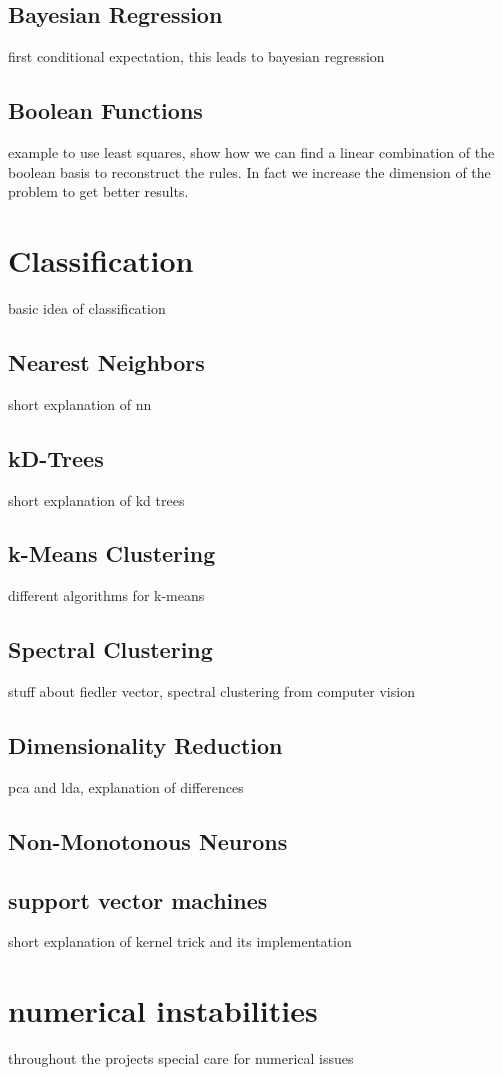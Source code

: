 \documentclass{article}
\begin{document}
\subsection{Bayesian Regression}
first conditional expectation, this leads to bayesian regression
\subsection{Boolean Functions}
example to use least squares, show how we can find a linear combination of the boolean basis to reconstruct the rules. In fact we increase the dimension of the problem to get better results.
\section{Classification}
basic idea of classification
\subsection{Nearest Neighbors}
short explanation of nn
\subsection{kD-Trees}
short explanation of kd trees
\subsection{k-Means Clustering}
different algorithms for k-means
\subsection{Spectral Clustering}
stuff about fiedler vector, spectral clustering from computer vision
\subsection{Dimensionality Reduction}
pca and lda, explanation of differences
\subsection{Non-Monotonous Neurons}

\subsection{support vector machines}
short explanation of kernel trick and its implementation
\section{numerical instabilities}
throughout the projects special care for numerical issues
\end{document}

